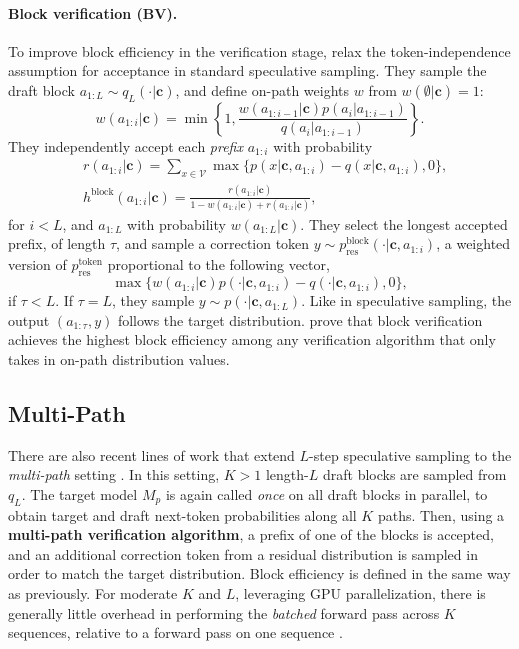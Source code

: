 \documentclass{article}
\theoremstyle{plain}
\theoremstyle{definition}
\theoremstyle{remark}
\newcommand{\V}{\mathcal{V}}
\newcommand{\con}{\boldsymbol{c}}
\newcommand{\ptokenres}{p_{\text{res}}^{\text{token}}}
\newcommand{\pblockres}{p_{\text{res}}^{\text{block}}}
\begin{document}
\paragraph{Block verification (BV).} To improve block efficiency in the verification stage, \citet{sun2024block} relax the token-independence assumption for acceptance in standard speculative sampling. They sample the draft block $a_{1:L} \sim q_L(\cdot|\con)$, and define on-path weights $w$ from $w(\emptyset|\con) = 1$:
\begin{equation}
    w(a_{1:i}|\con)=\min\left\{1,\frac{w(a_{1:i-1}|\con)p(a_i|a_{1:i-1})}{q(a_i|a_{1:i-1})}\right\}.
    \label{eqn:bv-weights}
\end{equation}They independently accept each \emph{prefix} $a_{1:i}$ with probability
\begin{align}
    &r(a_{1:i}|\con) = \sum_{x \in \V} \max\{p(x|\con,a_{1:i}) - q(x|\con,a_{1:i}),0\}, \\ 
    &h^{\text{block}}(a_{1:i}|\con) = \frac{r(a_{1:i}|\con)}{1-w(a_{1:i}|\con) + r(a_{1:i}|\con)},
\end{align}
for $i<L$, and $a_{1:L}$ with probability $w(a_{1:L}|\con)$. They select the longest accepted prefix, of length $\tau$, and sample a correction token $y\sim \pblockres(\cdot|\con,a_{1:i})$, a weighted version of $\ptokenres$ proportional to the following vector,
\begin{equation}
    \max\{w(a_{1:i}|\con)p(\cdot|\con,a_{1:i})-q(\cdot |\con,a_{1:i}),0\},
\end{equation}
if $\tau<L$. If $\tau=L$, they sample $y \sim p(\cdot|\con,a_{1:L})$. Like in speculative sampling, the output $(a_{1:\tau},y)$ follows the target distribution. \citet{sun2024block} prove that block verification achieves the highest block efficiency among any verification algorithm that only takes in on-path distribution values.

\subsection{Multi-Path}
\label{subsec:multi-path-background}

There are also recent lines of work that extend $L$-step speculative sampling to the \emph{multi-path} setting \citep{sun2023spectr,spector2023accelerating,cai2024medusa,li2024eagle}. In this setting, $K>1$ length-$L$ draft blocks are sampled from $q_L$. The target model $M_p$ is again called \emph{once} on all draft blocks in parallel, to obtain target and draft next-token probabilities along all $K$ paths. Then, using a \textbf{multi-path verification algorithm}, a prefix of one of the blocks is accepted, and an additional correction token from a residual distribution is sampled in order to match the target distribution. Block efficiency is defined in the same way as previously. For moderate $K$ and $L$, leveraging GPU parallelization, there is generally little overhead in performing the \emph{batched} forward pass across $K$ sequences, relative to a forward pass on one sequence \citep{agrawal2024sarathiserve,dao2022flashattention}. 
\end{document}
